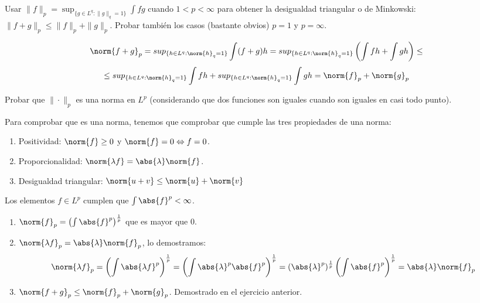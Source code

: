 
\begin{problem}[5] Usar $\|f\|_p= \operatorname{sup}_{\{g\in L^q: \|g\|_q=1\}} \int fg $ cuando $1 < p <  \infty$
para obtener la desigualdad triangular o de Minkowski: $\|f + g\|_p \le \|f\|_p + \|g\|_p$.
Probar tambi\'en los casos (bastante obvios) $p=1$  y  $p = \infty$.
\solution

\begin{expla}

\end{expla}
\[
\norm{f+g}_p = sup_{\{h\in L^q: \norm{h}_q=1\}}\int (f+g)h =  sup_{\{h\in L^q: \norm{h}_q=1\}}\left(\int fh + \int gh\right) \leq 
\]
\[
\leq sup_{\{h\in L^q: \norm{h}_q=1\}}\int fh +  sup_{\{h\in L^q: \norm{h}_q=1\}} \int gh = \norm{f}_p + \norm{g}_p   
\]
\end{problem}


\begin{problem}[6] Probar que $\|\cdot\|_p$ es una norma en $L^p$ (considerando que dos funciones
son iguales
cuando son iguales en casi todo punto).
\solution

\begin{expla}
Para comprobar que es una norma, tenemos que comprobar que cumple las tres propiedades de una norma:
\begin{enumerate}
\item Positividad: $\norm{f}\geq 0$ y $\norm{f} = 0 \Leftrightarrow f=0$.
\item Proporcionalidad: $\norm{\lambda f} = \abs{\lambda}\norm{f}$.
\item Desigualdad triangular: $\norm{u+v} \leq \norm{u}+\norm{v}$     
\end{enumerate}

Los elementos $f \in L^p$ cumplen que $\int \abs{f}^p < \infty$. 
\end{expla}
\begin{enumerate}
\item $\norm{f}_p = \left( \int \abs{f}^p\right)^\frac{1}{p}$ que es mayor que 0.
\item $\norm{\lambda f}_p=\abs{\lambda}\norm{f}_p$, lo demostramos: 
\[
\norm{\lambda f}_p =\left( \int \abs{\lambda f}^p \right)^{\frac{1}{p}} = \left( \int \abs{\lambda}^p \abs{f}^p\right)^{\frac{1}{p}} = (\abs{\lambda}^p)^{\frac{1}{p}} \left(\int \abs{f}^p\right)^{\frac{1}{p}} = \abs{\lambda} \norm{f}_p  
\]
\item $\norm{f+g}_p \leq \norm{f}_p+\norm{g}_p$.
Demostrado en el ejercicio anterior.
\end{enumerate}

\end{problem}

